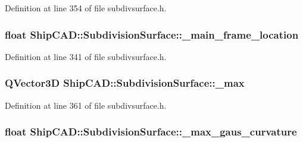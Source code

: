 Definition at line 354 of file subdivsurface.\-h.

\hypertarget{classShipCAD_1_1SubdivisionSurface_a3ea08aa45ad221a1b485010ce5e8dee7}{
\subsubsection[{\-\_\-main\-\_\-frame\-\_\-location}]{\setlength{\rightskip}{0pt plus 5cm}float Ship\-C\-A\-D\-::\-Subdivision\-Surface\-::\-\_\-main\-\_\-frame\-\_\-location\hspace{0.3cm}{\ttfamily [protected]}}}\label{classShipCAD_1_1SubdivisionSurface_a3ea08aa45ad221a1b485010ce5e8dee7}


Definition at line 341 of file subdivsurface.\-h.

\hypertarget{classShipCAD_1_1SubdivisionSurface_a9b21a31f620de3b73100ca83d76002b7}{
\subsubsection[{\-\_\-max}]{\setlength{\rightskip}{0pt plus 5cm}Q\-Vector3\-D Ship\-C\-A\-D\-::\-Subdivision\-Surface\-::\-\_\-max\hspace{0.3cm}{\ttfamily [protected]}}}\label{classShipCAD_1_1SubdivisionSurface_a9b21a31f620de3b73100ca83d76002b7}


Definition at line 361 of file subdivsurface.\-h.

\hypertarget{classShipCAD_1_1SubdivisionSurface_a1658374385131656d359ff373d2cb08c}{
\subsubsection[{\-\_\-max\-\_\-gaus\-\_\-curvature}]{\setlength{\rightskip}{0pt plus 5cm}float Ship\-C\-A\-D\-::\-Subdivision\-Surface\-::\-\_\-max\-\_\-gaus\-\_\-curvature\hspace{0.3cm}{\ttfamily [protected]}}}\label{classShipCAD_1_1SubdivisionSurface_a1658374385131656d359ff373d2cb08c}


